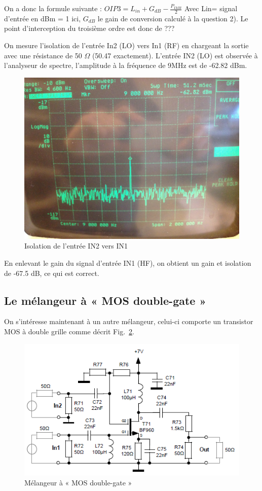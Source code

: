 \documentclass{article}
\begin{document}
On a donc la formule suivante : $OIP3=L_{in}+G_{dB}-\frac{P_{IMR}}{2}$
Avec Lin= signal d'entrée en dBm = 1 ici, $G_{dB}$ le gain de conversion calculé à la question 2).
%
Le point d'interception du troisième ordre est donc de ???
 

On mesure l'isolation de l'entrée In2 (LO) vers In1 (RF) en chargeant la sortie avec une résistance de 50 $\Omega$ (50.47 exactement).
L'entrée IN2 (LO) est observée à l'analyseur de spectre, l'amplitude à la fréquence de 9MHz est de -62.82 dBm.

\begin{figure}[h!]
	\centering
	\includegraphics[width=.7\textwidth]{9_3_5}
	\caption{Isolation de l'entrée IN2 vers IN1}
	\label{fig:9_3_5}
\end{figure}

En enlevant le gain du signal d'entrée IN1 (HF), on obtient un gain et isolation de -67.5 dB, ce qui est correct.


\subsection{Le mélangeur à « MOS double-gate »}

On s'intéresse maintenant à un autre mélangeur, celui-ci comporte un transistor MOS à double grille comme décrit Fig.~\ref{fig:schema_melangeur_mosdoublegate}.

\begin{figure}[h!]
	\centering
	\includegraphics[width=.7\textwidth]{schema_melangeur_mosdoublegate}
	\caption{Mélangeur à « MOS double-gate »}
	\label{fig:schema_melangeur_mosdoublegate}
\end{figure}
\end{document}
